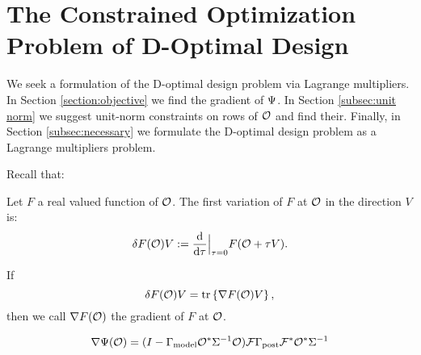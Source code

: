 \section{The Constrained Optimization Problem of D-Optimal Design}\label{section:D and grad}
We seek a formulation of the D-optimal design problem
\cite{AlexanderianGloorGhattas14} via Lagrange multipliers. In Section
\ref{section:objective} we find the gradient of $\Psi$. In Section
\ref{subsec:unit norm} we suggest unit-norm constraints on rows of
$\mathcal{O}$ and find their. Finally, in Section \ref{subsec:necessary} we
formulate the D-optimal design problem as a Lagrange multipliers
problem.

Recall that:

\begin{definition}\label{def:var}
  Let $F$ a real valued function of $\mathcal{O}$. The first variation of $F$
  at $\mathcal{O}$ in the direction $V$ is:
  \begin{equation*}
    \delta F(\obs) V := \frac{\der}{\der \tau}\Big |_{\tau=0}  F( \obs + \tau V).
  \end{equation*}

  If
  \begin{equation*}
    \delta F(\obs) V = \tr{\nabla F(\obs) V},
  \end{equation*}
  then we call $\nabla F(\mathcal{O})$ the gradient of $F$ at $\mathcal{O}$. 
\end{definition}

\begin{proposition}\label{prop:tar var}
  \begin{equation*}
    \nabla \tar(\obs) = ( I - \modcov \obs^* \Sigma^{-1}\obs ) \fwd
    \postcov \fwd^* \obs^* \Sigma^{-1}
  \end{equation*}
\end{proposition}

